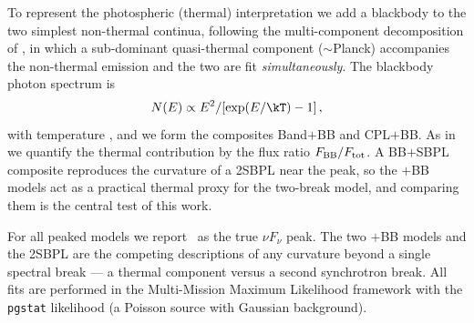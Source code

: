 To represent the photospheric (thermal) interpretation we add a blackbody to the
two simplest non-thermal continua, following the multi-component decomposition of
\citet{Guiriec2011,Guiriec2015}, in which a sub-dominant quasi-thermal component
($\sim$Planck) accompanies the non-thermal emission and the two are fit
\emph{simultaneously}. The blackbody photon spectrum is
\begin{equation}
N(E)\propto E^{2}/\!\left[\exp(E/\kT)-1\right],
\end{equation}
with temperature \kT, and we form the composites Band$+$BB and CPL$+$BB. As in
\citet{Guiriec2015} we quantify the thermal contribution by the flux ratio
$F_{\rm BB}/F_{\rm tot}$. A BB$+$SBPL composite reproduces the curvature of a
2SBPL near the peak, so the $+$BB models act as a practical thermal proxy for the
two-break model, and comparing them is the central test of this work.

For all peaked models we report \Ep\ as the true $\nu F_\nu$ peak. The two $+$BB
models and the 2SBPL are the competing descriptions of any curvature beyond a
single spectral break --- a thermal component versus a second synchrotron break.
All fits are performed in the Multi-Mission Maximum Likelihood framework
\citep[3ML;][]{Vianello2015} with the \texttt{pgstat} likelihood (a Poisson
source with Gaussian background).
